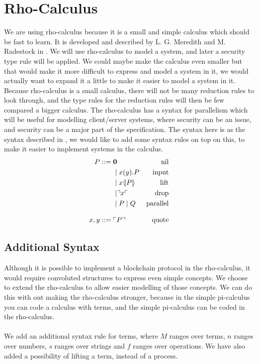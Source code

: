 \section{Rho-Calculus}\label{ch:rho-calculus}
We are using rho-calculus because it is a small and simple calculus which should be fast to learn.
It is developed and described by L. G. Meredith and M. Radestock in \citep{Meredith2005}.
We will use rho-calculus to model a system, and later a security type rule will be applied. We could maybe make the calculus even smaller but that would make it more difficult to express and model a system in it, we would actually want to expand it a little to make it easier to model a system in it.
Because rho-calculus is a small calculus, there will not be many reduction rules to look through, and the type rules for the reduction rules will then be few compared a bigger calculus.
The rho-calculus has a syntax for parallelism which will be useful for modelling client/server systems, where security can be an issue, and security can be a major part of the specification. 
The syntax here is as the syntax described in \citep{Meredith2005}, we would like to add some syntax rules on top on this, to make it easier to implement systems in the calculus.
\begin{align*}
    P  ::= \; &  \mathbf{0} & \text{nil} \\
      & \mid x(y).P & \text{input} \\
      & \mid x \langle \! | P | \! \rangle & \text{lift} \\
      & \mid \urcorner x \ulcorner & \text{drop} \\
      & \mid P \mid Q & \text{parallel} \\[3mm]
    x,y ::= \; & \ulcorner P \urcorner & \text{quote}\\
\end{align*}



\subsection{Additional Syntax} \label{sec:addsyntax}
Although it is possible to implement a blockchain protocol in the rho-calculus, it would require convoluted structures to express even simple concepts.
We choose to extend the rho-calculus to allow easier modelling of those concepts.
We can do this with out making the rho-calculus stronger, because in the simple pi-calculus you can code a calculus with terms\citep{Baldamus2005}, and the simple pi-calculus can be coded in the rho-calculus\citep{Meredith2005}.\\
\\
We add an additional syntax rule for terms, where $M$ ranges over terms, $n$ ranges over numbers, $s$ ranges over strings and $f$ ranges over operations. We have also added a possibility of lifting a term, instead of a process.

